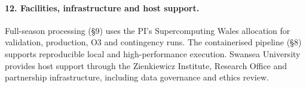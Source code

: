 \paragraph{12. Facilities, infrastructure and host support.}
Full-season processing (\S9) uses the PI's Supercomputing Wales allocation for validation, production, O3 and contingency runs. The containerised pipeline (\S8) supports reproducible local and high-performance execution. Swansea University provides host support through the Zienkiewicz Institute, Research Office and partnership infrastructure, including data governance and ethics review.
